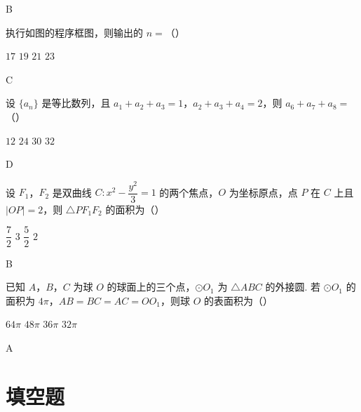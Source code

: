 \begin{answer}
B
\end{answer}

\begin{problem}
执行如图的程序框图，则输出的 \(n=\)（\quad）


\choices
    {\(17\)}
    {\(19\)}
    {\(21\)}
    {\(23\)}
\end{problem}

\begin{answer}
C
\end{answer}

\begin{problem}
设 \(\{a_n\}\) 是等比数列，且 \(a_1+a_2+a_3=1\)，\(a_2+a_3+a_4=2\)，则 \(a_6+a_7+a_8=\)（\quad）

\choices
    {\(12\)}
    {\(24\)}
    {\(30\)}
    {\(32\)}
\end{problem}

\begin{answer}
D
\end{answer}

\begin{problem}
设 \(F_1\)，\(F_2\) 是双曲线 \(C:x^2-\dfrac{y^2}{3}=1\) 的两个焦点，\(O\) 为坐标原点，点 \(P\) 在 \(C\) 上且 \(\lvert OP\rvert=2\)，则 \(\triangle PF_1F_2\) 的面积为（\quad）

\choices
    {\(\dfrac{7}{2}\)}
    {\(3\)}
    {\(\dfrac{5}{2}\)}
    {\(2\)}
\end{problem}

\begin{answer}
B
\end{answer}

\begin{problem}
已知 \(A\)，\(B\)，\(C\) 为球 \(O\) 的球面上的三个点，\(\odot O_1\) 为 \(\triangle ABC\) 的外接圆. 若 \(\odot O_1\) 的面积为 \(4\pi\)，\(AB=BC=AC=OO_1\)，则球 \(O\) 的表面积为（\quad）

\choices
    {\(64\pi\)}
    {\(48\pi\)}
    {\(36\pi\)}
    {\(32\pi\)}
\end{problem}

\begin{answer}
A
\end{answer}

\section{填空题}

